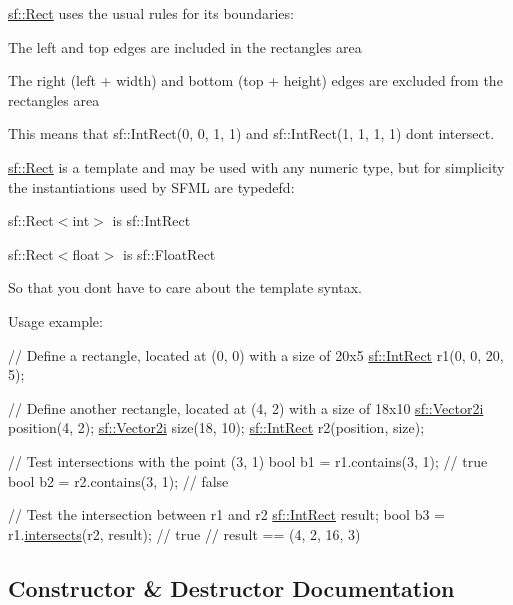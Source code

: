 \hyperlink{classsf_1_1_rect}{sf\+::\+Rect} uses the usual rules for its boundaries\+: \begin{DoxyItemize}
\item The left and top edges are included in the rectangle\textquotesingle{}s area \item The right (left + width) and bottom (top + height) edges are excluded from the rectangle\textquotesingle{}s area\end{DoxyItemize}
This means that sf\+::\+Int\+Rect(0, 0, 1, 1) and sf\+::\+Int\+Rect(1, 1, 1, 1) don\textquotesingle{}t intersect.

\hyperlink{classsf_1_1_rect}{sf\+::\+Rect} is a template and may be used with any numeric type, but for simplicity the instantiations used by S\+F\+ML are typedef\textquotesingle{}d\+: \begin{DoxyItemize}
\item sf\+::\+Rect$<$int$>$ is sf\+::\+Int\+Rect \item sf\+::\+Rect$<$float$>$ is sf\+::\+Float\+Rect\end{DoxyItemize}
So that you don\textquotesingle{}t have to care about the template syntax.

Usage example\+: 
\begin{DoxyCode}
\textcolor{comment}{// Define a rectangle, located at (0, 0) with a size of 20x5}
\hyperlink{classsf_1_1_rect}{sf::IntRect} r1(0, 0, 20, 5);

\textcolor{comment}{// Define another rectangle, located at (4, 2) with a size of 18x10}
\hyperlink{classsf_1_1_vector2}{sf::Vector2i} position(4, 2);
\hyperlink{classsf_1_1_vector2}{sf::Vector2i} size(18, 10);
\hyperlink{classsf_1_1_rect}{sf::IntRect} r2(position, size);

\textcolor{comment}{// Test intersections with the point (3, 1)}
\textcolor{keywordtype}{bool} b1 = r1.contains(3, 1); \textcolor{comment}{// true}
\textcolor{keywordtype}{bool} b2 = r2.contains(3, 1); \textcolor{comment}{// false}

\textcolor{comment}{// Test the intersection between r1 and r2}
\hyperlink{classsf_1_1_rect}{sf::IntRect} result;
\textcolor{keywordtype}{bool} b3 = r1.\hyperlink{classsf_1_1_rect_ad90321b1135cad31589f2db2f9b772db}{intersects}(r2, result); \textcolor{comment}{// true}
\textcolor{comment}{// result == (4, 2, 16, 3)}
\end{DoxyCode}
 

\subsection{Constructor \& Destructor Documentation}
\mbox{\label{classsf_1_1_rect_a0f87ebaef9722a6222fd2e04ce8efb37}} 
